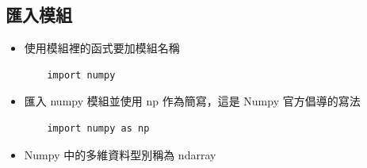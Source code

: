 \documentclass[a4paper,12pt]{article}
\begin{document}
\subsection{匯入模組}
\label{sec:orgb19a2c1}
\begin{itemize}
\item 使用模組裡的函式要加模組名稱\\
\lstset{breaklines=true,language=Python,label= ,caption= ,captionpos=b,numbers=none}
\begin{lstlisting}
    import numpy
\end{lstlisting}
\item 匯入 numpy 模組並使用 np 作為簡寫，這是 Numpy 官方倡導的寫法\\
\lstset{breaklines=true,language=Python,label= ,caption= ,captionpos=b,numbers=none}
\begin{lstlisting}
    import numpy as np
\end{lstlisting}
\item Numpy 中的多維資料型別稱為 ndarray\\
\end{itemize}
\end{document}

